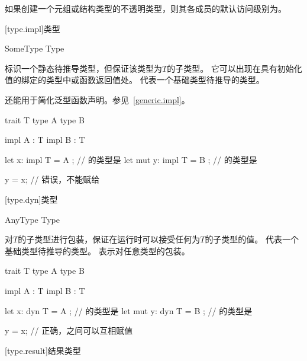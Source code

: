 \pnum
如果创建一个元组或结构类型的不透明类型，则其各成员的默认访问级别为。

[type.impl]{类型}

\begin{bnf}{SomeType}
     Type \br
     \terminal{_}
\end{bnf}

\pnum
{}标识一个静态待推导类型，但保证该类型为$T$的子类型。
它可以出现在具有初始化值的绑定的类型中或函数返回值处。
代表一个基础类型待推导的类型。

\pnum
{}还能用于简化泛型函数声明。参见~\ref{generic.impl}。

\enterexample
\begin{codeblock}

trait T { }
type A { }
type B { }

impl A : T { }
impl B : T { }

let x: impl T = A { }; // 的类型是
let mut y: impl T = B { }; // 的类型是

y = x; // 错误，不能赋给

\end{codeblock}
\exitexample

[type.dyn]{类型}

\begin{bnf}{AnyType}
     Type \br
     \terminal{_} \br
\end{bnf}

\pnum
{}对$T$的子类型进行包装，保证在运行时可以接受任何为$T$的子类型的值。
代表一个基础类型待推导的类型。
表示对任意类型的包装。

\enterexample
\begin{codeblock}

trait T { }
type A { }
type B { }

impl A : T { }
impl B : T { }

let x: dyn T = A { }; // 的类型是
let mut y: dyn T = B { }; // 的类型是

y = x; // 正确，之间可以互相赋值

\end{codeblock}
\exitexample

[type.result]{结果类型}

